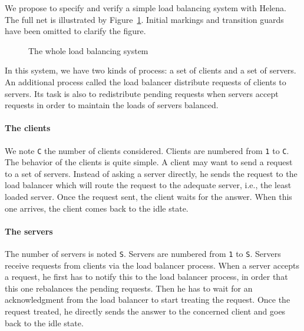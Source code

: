 We propose to specify and verify a simple load balancing system with
Helena.  The full net is illustrated by
Figure~\ref{fig_load_balancer}. Initial markings and transition guards
have been omitted to clarify the figure.

\begin{figure}[!h]
\centerline{}
\caption{The whole load balancing system}
\label{fig_load_balancer}
\end{figure}

In this system, we have two kinds of process: a set of clients and a
set of servers. An additional process called the load balancer
distribute requests of clients to servers. Its task is also to
redistribute pending requests when servers accept requests in order to
maintain the loads of servers balanced.

\paragraph{The clients}
We note \lstinline{C} the number of clients considered. Clients are
numbered from \lstinline{1} to \lstinline{C}. The behavior of the
clients is quite simple. A client may want to send a request to a set
of servers. Instead of asking a server directly, he sends the request
to the load balancer which will route the request to the adequate
server, i.e., the least loaded server. Once the request sent, the
client waits for the answer. When this one arrives, the client comes
back to the idle state.

\paragraph{The servers}
The number of servers is noted \lstinline{S}. Servers are numbered from
\lstinline{1} to \lstinline{S}. Servers receive requests from clients via the
load balancer process. When a server accepts a request, he first has
to notify this to the load balancer process, in order that this one
rebalances the pending requests. Then he has to wait for an
acknowledgment from the load balancer to start treating the request.
Once the request treated, he directly sends the answer to the
concerned client and goes back to the idle state.

